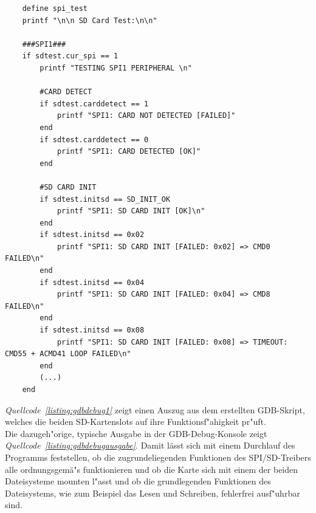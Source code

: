 \documentclass[11pt]{article}
\newcommand*{\coderef}[1]{\textit{Quellcode~\ref{#1}}}
\begin{document}
\begin{listing}[H]
    \begin{verbatim}
    define spi_test
    printf "\n\n SD Card Test:\n\n"

    ###SPI1###
    if sdtest.cur_spi == 1
        printf "TESTING SPI1 PERIPHERAL \n"

        #CARD DETECT
        if sdtest.carddetect == 1
            printf "SPI1: CARD NOT DETECTED [FAILED]"
        end
        if sdtest.carddetect == 0
            printf "SPI1: CARD DETECTED [OK]"
        end

        #SD CARD INIT
        if sdtest.initsd == SD_INIT_OK
            printf "SPI1: SD CARD INIT [OK]\n"
        end
        if sdtest.initsd == 0x02
            printf "SPI1: SD CARD INIT [FAILED: 0x02] => CMD0 FAILED\n"
        end
        if sdtest.initsd == 0x04
            printf "SPI1: SD CARD INIT [FAILED: 0x04] => CMD8 FAILED\n"
        end
        if sdtest.initsd == 0x08
            printf "SPI1: SD CARD INIT [FAILED: 0x08] => TIMEOUT: CMD55 + ACMD41 LOOP FAILED\n"
        end
        (...)
    end
    \end{verbatim}
\caption{Auszug aus \texttt{test/spi\_test.gdb}}
\label{listing:gdbdebug1}
\end{listing}


\coderef{listing:gdbdebug1} zeigt einen Auszug aus dem erstellten GDB-Skript, welches die beiden SD-Kartenslots
auf ihre Funktionsf"ahigkeit pr"uft.\\
Die dazugeh"orige, typische Ausgabe in der GDB-Debug-Konsole zeigt \coderef{listing:gdbdebugausgabe}.
Damit lässt sich mit einem Durchlauf des Programms feststellen, ob die zugrundeliegenden
Funktionen des SPI/SD-Treibers alle ordnungsgemä"s funktionieren und ob die Karte sich mit 
einem der beiden Dateisysteme mounten l"asst und ob die grundlegenden Funktionen des Dateisystems, wie zum Beispiel das Lesen und Schreiben, fehlerfrei ausf"uhrbar sind.
\end{document}
